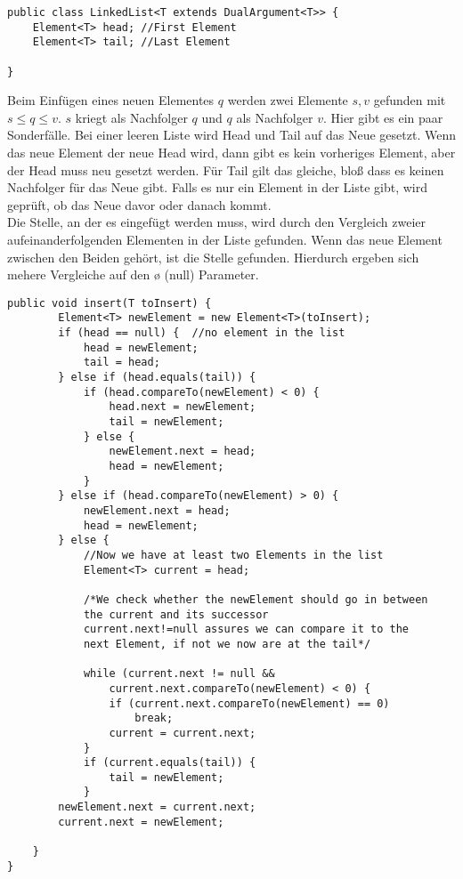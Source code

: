 \begin{lstlisting}[mathescape]
public class LinkedList<T extends DualArgument<T>> {
    Element<T> head; //First Element 
    Element<T> tail; //Last Element
    
}
\end{lstlisting}
Beim Einfügen eines neuen Elementes $q$ werden zwei Elemente $s,v$ gefunden mit $s\leq q \leq v$. $s$ kriegt als Nachfolger $q$ und $q$ als Nachfolger $v$. Hier gibt es ein paar Sonderfälle. Bei einer leeren Liste wird Head und Tail auf das Neue gesetzt. Wenn das neue Element der neue Head wird, dann gibt es kein vorheriges Element, aber der Head muss neu gesetzt werden. Für Tail gilt das gleiche, bloß dass es keinen Nachfolger für das Neue gibt. Falls es nur ein Element in der Liste gibt, wird geprüft, ob das Neue davor oder danach kommt.\\
Die Stelle, an der es eingefügt werden muss, wird durch den Vergleich zweier aufeinanderfolgenden Elementen in der Liste gefunden. Wenn das neue Element zwischen den Beiden gehört, ist die Stelle gefunden. Hierdurch ergeben sich mehere Vergleiche auf den ø (null) Parameter.

\begin{lstlisting}[mathescape]
public void insert(T toInsert) {
        Element<T> newElement = new Element<T>(toInsert);
        if (head == null) {  //no element in the list
            head = newElement;
            tail = head;
        } else if (head.equals(tail)) {
            if (head.compareTo(newElement) < 0) {
                head.next = newElement;
                tail = newElement;
            } else {
                newElement.next = head;
                head = newElement;
            }
        } else if (head.compareTo(newElement) > 0) {
            newElement.next = head;
            head = newElement;
        } else {
            //Now we have at least two Elements in the list
            Element<T> current = head;
            
            /*We check whether the newElement should go in between 
            the current and its successor
            current.next!=null assures we can compare it to the 
            next Element, if not we now are at the tail*/
            
            while (current.next != null &&
                current.next.compareTo(newElement) < 0) {
                if (current.next.compareTo(newElement) == 0)
                    break;
                current = current.next;
            }
            if (current.equals(tail)) {
                tail = newElement;
            }
        newElement.next = current.next;
        current.next = newElement;

    }
}
\end{lstlisting}

